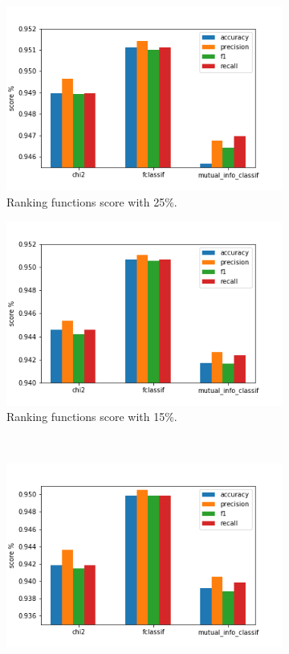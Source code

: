 \begin{figure}[]
	\centering
	\begin{subfigure}[t]{0.48\textwidth}
		\centering
		\includegraphics[width=\linewidth]{univariance25.png}
		\caption{Ranking functions score with 25\%.}\label{fig:ranking25}		
	\end{subfigure}
	\begin{subfigure}[t]{0.48\textwidth}
		\centering
		\includegraphics[width=\linewidth]{univariance15.png}
		\caption{Ranking functions score with 15\%.}\label{fig:ranking15}
	\end{subfigure}\\
	\begin{subfigure}[t]{0.48\textwidth}
		\centering
		\includegraphics[width=\linewidth]{univariance10.png}

\end{subfigure}
\end{figure}
